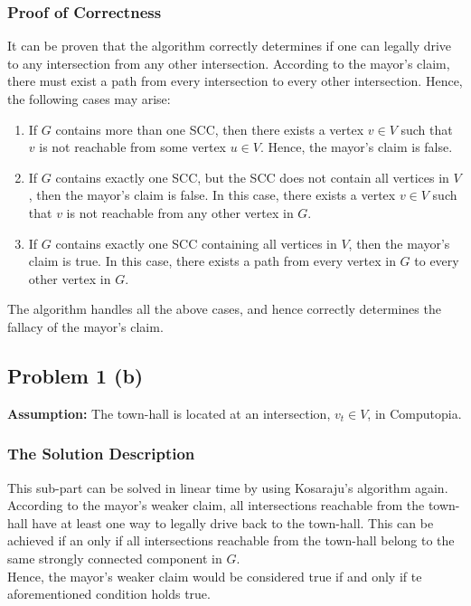\documentclass[12pt]{report}
\begin{document}
    \subsubsection*{Proof of Correctness}
    It can be proven that the algorithm correctly determines if one can legally drive to any intersection from any other intersection.
    According to the mayor's claim, there must exist a path from every intersection to every other intersection.
    Hence, the following cases may arise:
    \begin{enumerate}
        \item
        If $G$ contains more than one SCC, then there exists a vertex $v \in V$ such that $v$ is not reachable from some vertex $u \in V$.
        Hence, the mayor's claim is false.
        \item
        If $G$ contains exactly one SCC, but the SCC does not contain all vertices in $V$, then the mayor's claim is false.
        In this case, there exists a vertex $v \in V$ such that $v$ is not reachable from any other vertex in $G$.
        \item
        If $G$ contains exactly one SCC containing all vertices in $V$, then the mayor's claim is true.
        In this case, there exists a path from every vertex in $G$ to every other vertex in $G$.
    \end{enumerate}
    The algorithm handles all the above cases, and hence correctly determines the fallacy of the mayor's claim.

    \subsection*{Problem 1 (b)}
    \textbf{Assumption:} The town-hall is located at an intersection, $v_{t} \in V$, in Computopia.

    \subsubsection*{The Solution Description}
    This sub-part can be solved in linear time by using Kosaraju's algorithm again. \\
    According to the mayor's weaker claim, all intersections reachable from the town-hall have at least one way to legally drive back to the town-hall.
    This can be achieved if an only if all intersections reachable from the town-hall belong to the same strongly connected component in $G$. \\
    Hence, the mayor's weaker claim would be considered true if and only if te aforementioned condition holds true.
\end{document}
